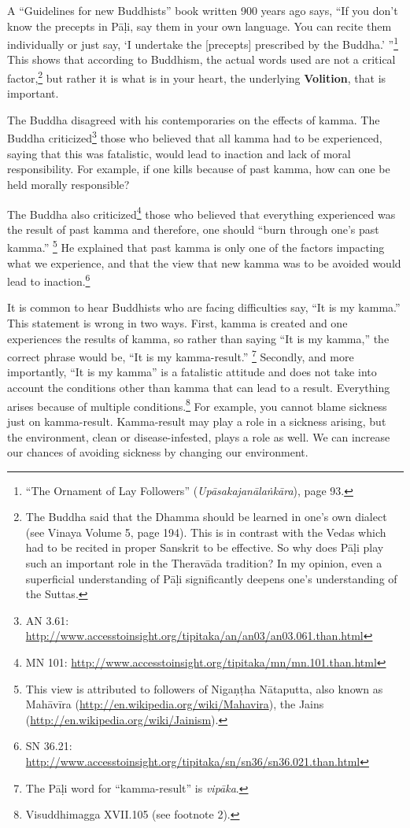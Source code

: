 A “Guidelines for new Buddhists” book written 900 years ago says, “If you don’t know the precepts in Pāḷi, say them in your own language. You can recite them individually or just say, ‘I undertake the [precepts] prescribed by the Buddha.’ ”\footnote{“The Ornament of Lay Followers” (\textit{Upāsakajanālaṅkāra}), page 93.} This shows that according to Buddhism, the actual words used are not a critical factor,\footnote{The Buddha said that the Dhamma should be learned in one’s own dialect (see Vinaya Volume 5, page 194). This is in contrast with the Vedas which had to be recited in proper Sanskrit to be effective. So why does Pāḷi play such an important role in the Theravāda tradition? In my opinion, even a superficial understanding of Pāḷi significantly deepens one’s understanding of the Suttas.} but rather it is what is in your heart, the underlying \textbf{Volition}, that is important.

The Buddha disagreed with his contemporaries on the effects of kamma. The Buddha criticized\footnote{AN 3.61: \url{http://www.accesstoinsight.org/tipitaka/an/an03/an03.061.than.html}} those who believed that all kamma had to be experienced, saying that this was fatalistic, would lead to inaction and lack of moral responsibility. For example, if one kills because of past kamma, how can one be held morally responsible? 

The Buddha also criticized\footnote{MN 101: \url{http://www.accesstoinsight.org/tipitaka/mn/mn.101.than.html}} those who believed that everything experienced was the result of past kamma and therefore, one should “burn through one’s past kamma.” \footnote{This view is attributed to followers of Nigaṇṭha Nātaputta, also known as Mahāvīra (\url{http://en.wikipedia.org/wiki/Mahavira}), the Jains (\url{http://en.wikipedia.org/wiki/Jainism}).} He explained that past kamma is only one of the factors impacting what we experience, and that the view that new kamma was to be avoided would lead to inaction.\footnote{SN 36.21: \url{http://www.accesstoinsight.org/tipitaka/sn/sn36/sn36.021.than.html}}

It is common to hear Buddhists who are facing difficulties say, “It is my kamma.” This statement is wrong in two ways. First, kamma is created and one experiences the results of kamma, so rather than saying “It is my kamma,” the correct phrase would be, “It is my kamma-result.” \footnote{The Pāḷi word for “kamma-result” is \textit{vipāka}.} Secondly, and more importantly, “It is my kamma” is a fatalistic attitude and does not take into account the conditions other than kamma that can lead to a result. Everything arises because of multiple conditions.\footnote{Visuddhimagga XVII.105 (see footnote 2).} For example, you cannot blame sickness just on kamma-result. Kamma-result may play a role in a sickness arising, but the environment, clean or disease-infested, plays a role as well. We can increase our chances of avoiding sickness by changing our environment.

